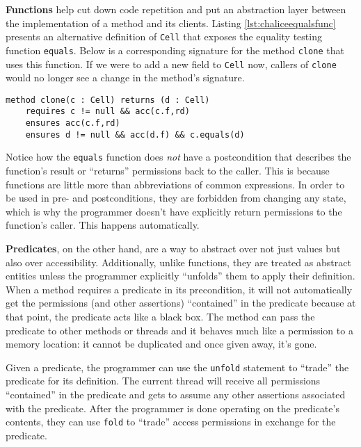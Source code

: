 \textbf{Functions} help cut down code repetition and put an abstraction layer between the implementation of a method and its clients. 
Listing \ref{lst:chaliceequalsfunc} presents an alternative definition of \lstinline!Cell! that exposes the equality testing function \lstinline!equals!. 
Below is a corresponding signature for the method \lstinline!clone! that uses this function. 
If we were to add a new field to \lstinline!Cell! now, callers of \lstinline!clone! would no longer see a change in the method's signature.

\begin{lstlisting}[language=Chalice]
method clone(c : Cell) returns (d : Cell)
    requires c != null && acc(c.f,rd)
    ensures acc(c.f,rd)
    ensures d != null && acc(d.f) && c.equals(d)
\end{lstlisting}

Notice how the \lstinline!equals! function does \emph{not} have a postcondition that describes the function's result or ``returns'' permissions back to the caller. 
This is because functions are little more than abbreviations of common expressions. 
In order to be used in pre- and postconditions, they are forbidden from changing any state, which is why the programmer doesn't have explicitly return permissions to the function's caller. 
This happens automatically.

\textbf{Predicates}, on the other hand, are a way to abstract over not just values but also over accessibility. 
Additionally, unlike functions, they are treated as abstract entities unless the programmer explicitly ``unfolds'' them to apply their definition.
When a method requires a predicate in its precondition, it will not automatically get the permissions (and other assertions) ``contained'' in the predicate because at that point, the predicate acts like a black box.
The method can pass the predicate to other methods or threads and it behaves much like a permission to a memory location: it cannot be duplicated and once given away, it's gone.

Given a predicate, the programmer can use the \lstinline[language=Chalice]!unfold! statement to ``trade'' the predicate for its definition. 
The current thread will receive all permissions ``contained'' in the predicate and gets to assume any other assertions associated with the predicate.
After the programmer is done operating on the predicate's contents, they can use \lstinline[language=Chalice]!fold! to ``trade'' access permissions in exchange for the predicate.

